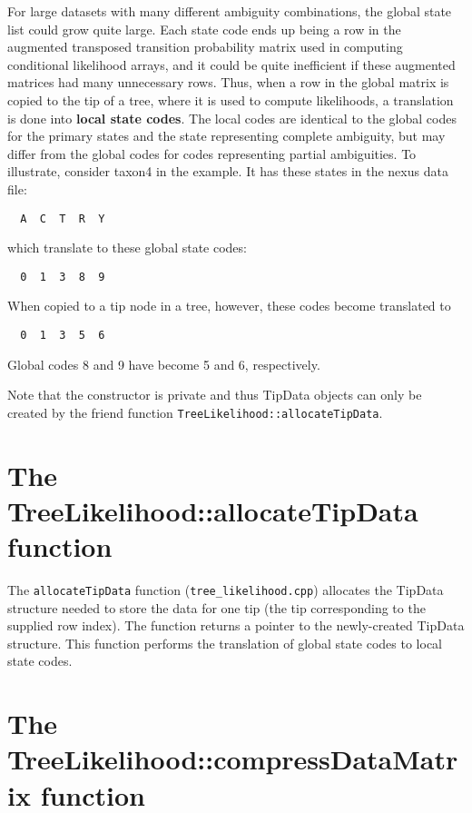 \documentclass[12pt]{article}
\newcommand{\cppfile}[1]{{\tt #1}}
\newcommand{\newterm}[1]{{\bfseries #1}}
\newcommand{\function}[1]{{\tt #1}}
\begin{document}
For large datasets with many different ambiguity combinations, the global state list could grow quite large. Each 
state code ends up being a row in the augmented transposed transition probability matrix used in computing 
conditional likelihood arrays, and it could be quite inefficient if these augmented matrices had many unnecessary 
rows. Thus, when a row in the global matrix is copied to the tip of a tree, where it is used to compute likelihoods,
a translation is done into \newterm{local state codes}. The local codes are identical to the global codes for the primary states and the state representing complete ambiguity, but may differ from the global codes for codes representing partial ambiguities. To illustrate, consider taxon4 in the example. It has these states in the nexus data file:
\begin{verbatim}
  A  C  T  R  Y
\end{verbatim}

which translate to these global state codes:
\begin{verbatim}
  0  1  3  8  9
\end{verbatim}

When copied to a tip node in a tree, however, these codes become translated to
\begin{verbatim}
  0  1  3  5  6
\end{verbatim}

Global codes 8 and 9 have become 5 and 6, respectively.

Note that the constructor is private and thus TipData objects can only be created by the friend function
\function{TreeLikelihood::allocateTipData}.

\section{The TreeLikelihood::allocateTipData function}

The \function{allocateTipData} function (\cppfile{tree\_likelihood.cpp}) allocates the TipData structure needed to store the data for one tip (the tip corresponding to the supplied row index). The function returns a pointer to the newly-created TipData structure. This function performs the translation of global state codes to local state codes.

\section{The TreeLikelihood::compressDataMatrix function}
\end{document}

